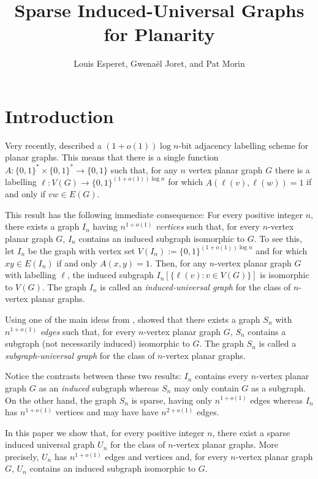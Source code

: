 \documentclass{article}
\title{Sparse Induced-Universal Graphs for Planarity}
\author{Louis Esperet, Gwenaël Joret, and Pat Morin}
\begin{document}
\maketitle

\section{Introduction}

Very recently, \citet{dujmovic.esperet.ea:adjacency} described a $(1+o(1))\log n$-bit adjacency labelling scheme for planar graphs.  This means that there is a single function $A:\{0,1\}^*\times\{0,1\}^* \to\{0,1\}$ such that, for any $n$ vertex planar graph $G$ there is a labelling $\ell:V(G)\to\{0,1\}^{(1+o(1))\log n}$ for which $A(\ell(v),\ell(w))=1$ if and only if $vw\in E(G)$.

This result has the following immediate consequence: For every positive integer $n$, there exists a graph $I_n$ having $n^{1+o(1)}$ \emph{vertices} such that, for every $n$-vertex planar graph $G$, $I_n$ contains an induced subgraph isomorphic to $G$.  To see this, let $I_n$ be the graph with vertex set $V(I_n):=\{0,1\}^{(1+o(1))\log n}$ and for which $xy\in E(I_n)$ if and only $A(x,y)=1$.  Then, for any $n$-vertex planar graph $G$ with labelling $\ell$, the induced subgraph $I_n[\{\ell(v):v\in V(G)\}]$ is isomorphic to $V(G)$.
The graph $I_n$ is called an \emph{induced-universal graph} for the class of $n$-vertex planar graphs.

Using one of the main ideas from \cite{dujmovic.esperet.ea:adjacency}, \citet{esperet.joret.ea:sparse} showed that there exists a graph $S_n$ with $n^{1+o(1)}$ \emph{edges} such that, for every $n$-vertex planar graph $G$, $S_n$ contains a subgraph (not necessarily induced) isomorphic to $G$.  The graph $S_n$ is called a \emph{subgraph-universal graph} for the class of $n$-vertex planar graphs.

Notice the contrasts between these two results: $I_n$ contains every $n$-vertex planar graph $G$ as an \emph{induced} subgraph whereas $S_n$ may only contain $G$ as a subgraph.  On the other hand, the graph $S_n$ is sparse, having only $n^{1+o(1)}$ edges whereas $I_n$ has $n^{1+o(1)}$ vertices and may have have $n^{2+o(1)}$ edges.

In this paper we show that, for every positive integer $n$, there exist a sparse induced universal graph $U_n$ for the class of $n$-vertex planar graphs.  More precisely, $U_n$ has $n^{1+o(1)}$ edges and vertices and, for every $n$-vertex planar graph $G$, $U_n$ contains an induced subgraph isomorphic to $G$.
\end{document}
